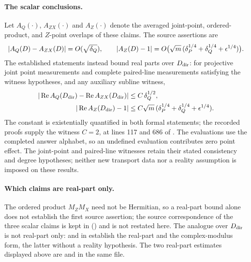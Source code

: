 \documentclass[11pt]{article}
\begin{document}
\paragraph{The scalar conclusions.}
Let $A_Q(\cdot)$, $A_{ZX}(\cdot)$ and $A_Z(\cdot)$ denote the averaged
joint-point, ordered-product, and $Z$-point overlaps of these claims.  The
source assertions are
\[
 |A_Q(D)-A_{ZX}(D)|=O(\sqrt{\delta_Q}),\qquad
 |A_Z(D)-1|=O\bigl(\sqrt m\,
   (\delta_P^{1/4}+\delta_Q^{1/4}+\epsilon^{1/4})\bigr).
\]
The established statements instead bound real parts over $D_{\rm dir}$: for
projective joint point measurements and complete paired-line measurements
satisfying the witness hypotheses, and any auxiliary subline witness,
\begin{align*}
 |\operatorname{Re}A_Q(D_{\rm dir})-
     \operatorname{Re}A_{ZX}(D_{\rm dir})|&\le C\,\delta_Q^{1/2},\\
 |\operatorname{Re}A_Z(D_{\rm dir})-1|&\le
 C\sqrt m\,(\delta_P^{1/4}+\delta_Q^{1/4}+\epsilon^{1/4}).
\end{align*}
The constant is existentially quantified in both formal statements; the
recorded proofs supply the witness $C=2$, at lines 117 and 686 of
.  The evaluations use the
completed answer alphabet, so an undefined evaluation contributes zero point
effect.  The joint-point and paired-line witnesses retain their stated
consistency and degree hypotheses; neither new transport data nor a reality
assumption is imposed on these results.

\paragraph{Which claims are real-part only.}
The ordered product $M_ZM_X$ need not be Hermitian, so a real-part bound
alone does not establish the first source assertion; the source
correspondence of the three scalar claims is kept in
() and is not restated here.  The 
analogue over $D_{\rm dir}$ is not real-part only:
 and
 in
 establish the real-part and
the complex-modulus form, the latter without a reality hypothesis.  The two
real-part estimates displayed above are
 and
 in the same file.
\end{document}
